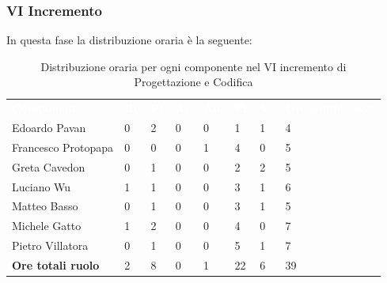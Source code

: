 \subsubsection{VI Incremento}
In questa fase la distribuzione oraria è la seguente:
\begin{table}[H]
\begin{center}
\renewcommand{\arraystretch}{1.25}
\begin{tabular}{ m{}<{\centering}  m{}<{\centering} m{}<{\centering} m{}<{\centering}  m{}<{\centering}  m{}<{\centering}  m{}<{\centering}  m{}<{\centering}   }
	\rowcolor{darkblue}
	\textcolor{white}{\textbf{Componente}} &\textcolor{white}{\textbf{Re}}&\textcolor{white}{\textbf{Pt}}&\textcolor{white}{\textbf{An}}&\textcolor{white}{\textbf{Am}}&\textcolor{white}{\textbf{Pr}}&\textcolor{white}{\textbf{Ve}}&\textcolor{white}{\textbf{Ore complessive}}\\ 
	Edoardo Pavan & 0 & 2 & 0 & 0 & 1 & 1 & 4 \\	
	
	Francesco Protopapa & 0 & 0 & 0 & 1 & 4 & 0 & 5 \\

	Greta Cavedon & 0 & 1 & 0 & 0 & 2 & 2 & 5 \\
	
	Luciano Wu & 1 & 1 & 0 & 0 & 3 & 1 & 6 \\
	
	Matteo Basso & 0 & 1 & 0 & 0 & 3 & 1 & 5 \\
	
	Michele Gatto & 1 & 2 & 0 & 0 & 4 & 0 & 7 \\
	
	Pietro Villatora & 0 & 1 & 0 & 0 & 5 & 1 & 7 \\
	
	\textbf{Ore totali ruolo} & 2 & 8 & 0 & 1 & 22 & 6 & 39 \\

\end{tabular}
\caption{Distribuzione oraria per ogni componente nel VI incremento di Progettazione e Codifica}
\end{center}
\end{table}

